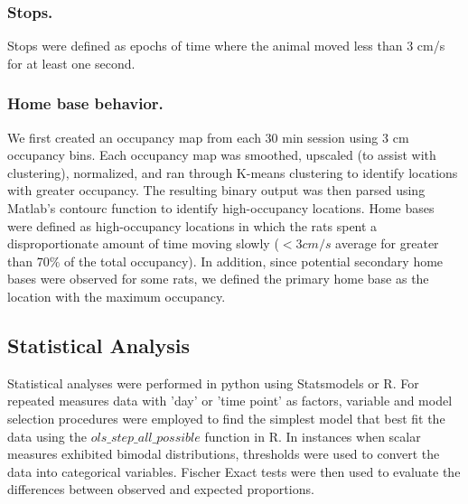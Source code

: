 \documentclass[fleqn,10pt]{wlscirep}
\begin{document}

\subsubsection*{Stops.} Stops were defined as epochs of time where the animal moved less than 3 cm/s for at least one second. 

\subsubsection*{Home base behavior.} 
We first created an occupancy map from each 30 min session using 3 cm occupancy bins. Each occupancy map was smoothed, upscaled (to assist with clustering), normalized, and ran through K-means clustering to identify locations with greater occupancy. The resulting binary output was then parsed using Matlab's contourc function to identify high-occupancy locations. Home bases were defined as high-occupancy locations in which the rats spent a disproportionate amount of time moving slowly ($< 3 cm/s$ average for greater than 70$\%$ of the total occupancy). In addition, since potential secondary home bases were observed for some rats, we defined the primary home base as the location with the maximum occupancy. 

\subsection*{Statistical Analysis} 
Statistical analyses were performed in python using Statsmodels or R. For repeated measures data with 'day' or 'time point' as factors, variable and model selection procedures were employed to find the simplest model that best fit the data using the $ols\_step\_all\_possible$ function in R. In instances when scalar measures exhibited bimodal distributions, thresholds were used to convert the data into categorical variables. Fischer Exact tests were then used to evaluate the differences between observed and expected proportions.
\end{document}
